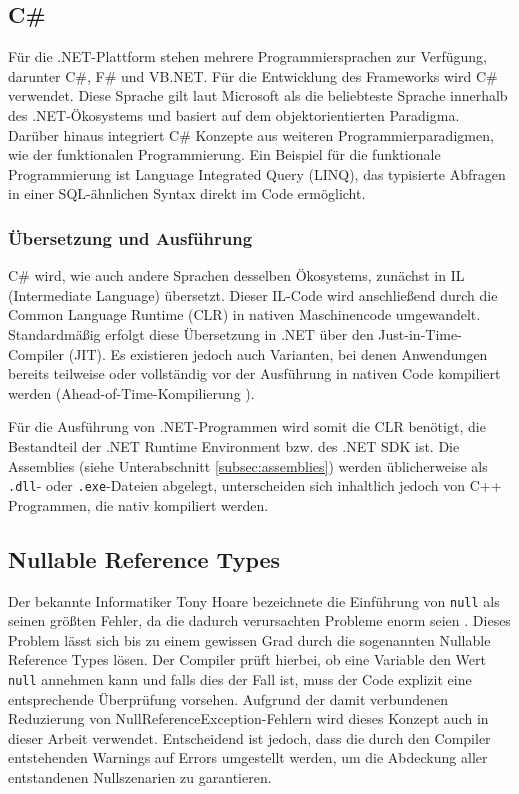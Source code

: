 \subsection{C\#}
\label{subsec:csharp}
Für die .NET-Plattform stehen mehrere Programmiersprachen zur Verfügung, darunter C\#, F\# und VB.NET. Für die Entwicklung des Frameworks wird C\# verwendet. Diese Sprache gilt laut Microsoft \cite{microsoft-tour-of-csharp} als die beliebteste Sprache innerhalb des .NET-Ökosystems und basiert auf dem objektorientierten Paradigma. Darüber hinaus integriert C\# Konzepte aus weiteren Programmierparadigmen, wie der funktionalen Programmierung. Ein Beispiel für die funktionale Programmierung ist Language Integrated Query (LINQ), das typisierte Abfragen in einer SQL-ähnlichen Syntax direkt im Code ermöglicht.

\subsubsection{Übersetzung und Ausführung}
C\# wird, wie auch andere Sprachen desselben Ökosystems, zunächst in IL (Intermediate Language) übersetzt. Dieser IL-Code wird anschließend durch die Common Language Runtime (CLR) \cite{microsoft-clr-overview} in nativen Maschinencode umgewandelt. Standardmäßig erfolgt diese Übersetzung in .NET über den Just-in-Time-Compiler (JIT). Es existieren jedoch auch Varianten, bei denen Anwendungen bereits teilweise oder vollständig vor der Ausführung in nativen Code kompiliert werden (Ahead-of-Time-Kompilierung \cite{microsoft-native-aot}).

Für die Ausführung von .NET-Programmen wird somit die CLR benötigt, die Bestandteil der .NET Runtime Environment bzw. des .NET SDK ist. Die Assemblies (siehe Unterabschnitt \ref{subsec:assemblies}) werden üblicherweise als \texttt{.dll}- oder \texttt{.exe}-Dateien abgelegt, unterscheiden sich inhaltlich jedoch von C++ Programmen, die nativ kompiliert werden.

\subsection{Nullable Reference Types}
Der bekannte Informatiker Tony Hoare bezeichnete die Einführung von \texttt{null} als seinen größten Fehler, da die dadurch verursachten Probleme enorm seien \cite{hoare_null_video}. Dieses Problem lässt sich bis zu einem gewissen Grad durch die sogenannten Nullable Reference Types \cite{microsoft-nullable-references} lösen. Der Compiler prüft hierbei, ob eine Variable den Wert \texttt{null} annehmen kann und falls dies der Fall ist, muss der Code explizit eine entsprechende Überprüfung vorsehen. Aufgrund der damit verbundenen Reduzierung von NullReferenceException-Fehlern wird dieses Konzept auch in dieser Arbeit verwendet. Entscheidend ist jedoch, dass die durch den Compiler entstehenden Warnings auf Errors umgestellt werden, um die Abdeckung aller entstandenen Nullszenarien zu garantieren.

